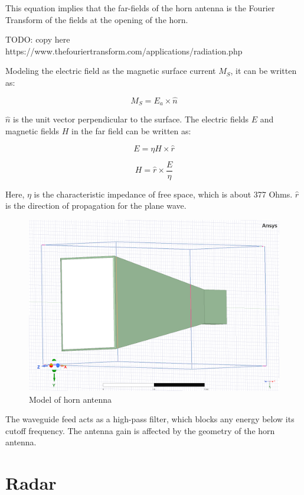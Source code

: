 \documentclass[a4paper,12pt]{report}
\begin{document}
This equation implies that the far-fields of the horn antenna
is the Fourier Transform of the fields at the opening of the horn.

TODO: copy here https://www.thefouriertransform.com/applications/radiation.php

Modeling the electric field as the magnetic surface current $M_S$,
it can be written as:

\begin{equation}
  M_S = E_a \times \hat{n}
\end{equation}

$\hat{n}$ is the unit vector perpendicular to the surface.
The electric fields $E$ and magnetic fields $H$ in the far field can be written as:

\begin{equation}
  E = \eta H \times \hat{r}
\end{equation}

\begin{equation}
  H = \hat{r} \times \frac{E}{\eta}
\end{equation}

Here, $\eta$ is the characteristic impedance of free space,
which is about 377 Ohms. $\hat{r}$ is the direction of propagation for the plane wave.

\begin{figure}
  \begin{center}
    \includegraphics[clip, keepaspectratio, width=0.5\linewidth]{img/horn_antenna_model.png}
    \caption{Model of horn antenna}
    \label{fig:model_horn_antenna}
  \end{center}
\end{figure}

The waveguide feed acts as a high-pass filter,
which blocks any energy below its cutoff frequency.
The antenna gain is affected by the geometry of the horn antenna.

\section{Radar}
\end{document}
